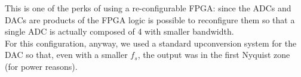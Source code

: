This is one of the perks of using a re-configurable FPGA: since the ADCs and DACs are products of the FPGA logic is possible to reconfigure them so that a single ADC is actually composed of 4 with smaller bandwidth.\\
For this configuration, anyway, we used a standard upconversion system for the DAC so that, even with a smaller $f_s$, the output was in the first Nyquist zone (for power reasons).